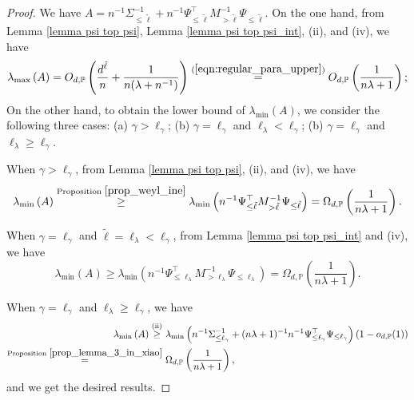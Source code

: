 \documentclass{article}
\theoremstyle{plain}
\theoremstyle{definition}
\theoremstyle{remark}
\begin{document}
\begin{appendix}
\begin{proof}
 We have $A = n^{-1}\Sigma_{\leq \tilde{\ell}}^{-1} + n^{-1}\Psi_{\leq \tilde{\ell}}^{\top} M_{>\tilde{\ell}}^{-1} \Psi_{\leq \tilde{\ell}}$. On the one hand, from Lemma \ref{lemma psi top psi}, Lemma \ref{lemma psi top psi_int}, (ii), and (iv), we have
\begin{equation*}
    \lambda_{\text{max}} \left(  A \right) = O_{d, \mathbb{P}}\left(\frac{d^{\tilde{\ell}}}{n} + \frac{1}{n(\lambda + n^{-1})}\right) \overset{(\ref{eqn:regular_para_upper})}{=} O_{d, \mathbb{P}}\left(\frac{1}{n\lambda + 1}\right);
\end{equation*}
On the other hand, to obtain the lower bound of $\lambda_{\text{min}} \left(  A \right)$, we consider the following three cases: 
(a) $\gamma >\ell_{\gamma}$;
(b) $\gamma = \ell_{\gamma}$ and $\ell_{\lambda} < \ell_{\gamma}$;
(b) $\gamma = \ell_{\gamma}$ and $\ell_{\lambda} \geq \ell_{\gamma}$.



When $\gamma >\ell_{\gamma}$, from Lemma \ref{lemma psi top psi}, (ii), and (iv), we have
$$
\lambda_{\text{min}} \left(  A \right) \overset{\text{Proposition } \ref{prop_weyl_ine}}{\geq} \lambda_{\text{min}} \left(n^{-1}\Psi_{\leq \tilde{\ell}}^{\top} M_{>\tilde{\ell}}^{-1} \Psi_{\leq \tilde{\ell}}\right)
= \Omega_{d, \mathbb{P}}\left(\frac{1}{n\lambda + 1}\right).
$$

When $\gamma = \ell_{\gamma}$ and $\tilde{\ell}= \ell_{\lambda} < \ell_{\gamma}$, 
from Lemma \ref{lemma psi top psi_int} and (iv), we have
$$
\lambda_{\text{min}} \left(  A \right) \geq \lambda_{\text{min}} \left(n^{-1}\Psi_{\leq \ell_{\lambda}}^{\top} M_{>\ell_{\lambda}}^{-1} \Psi_{\leq \ell_{\lambda}}\right)
= \Omega_{d, \mathbb{P}}\left(\frac{1}{n\lambda + 1}\right).
$$



 When $\gamma = \ell_{\gamma}$ and $\ell_{\lambda} \geq \ell_{\gamma}$, we have
\begin{equation*}
    \begin{aligned}
\lambda_{\text{min}} \left(  A \right) \overset{\text{(ii)}}{\geq} 
&~\lambda_{\text{min}} \left(n^{-1}\Sigma_{\leq \ell_{\gamma}}^{-1} + (n\lambda + 1)^{-1}n^{-1}\Psi_{\leq \ell_{\gamma}}^{\top} \Psi_{\leq \ell_{\gamma}}\right) (1- o_{d, \mathbb{P}}(1))\\
\overset{\text{Proposition } \ref{prop_lemma_3_in_xiao}}{=} &~
\Omega_{d, \mathbb{P}}\left(\frac{1}{n\lambda + 1}\right),
    \end{aligned}
\end{equation*}
and we get the desired results.

\end{proof}






\end{appendix}
\end{document}
